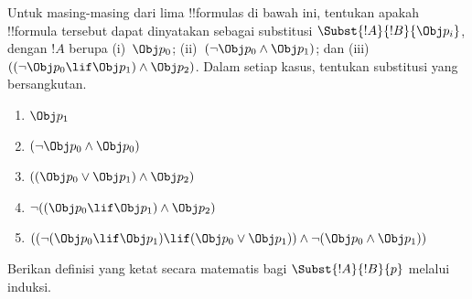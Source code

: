 \documentclass[../../../include/open-logic-section]{subfiles}
\begin{document}
\begin{prob} Untuk masing-masing dari lima !!{formula}s di bawah ini,
 tentukan apakah !!{formula} tersebut dapat dinyatakan sebagai substitusi
 \( \Subst{!A}{!B}{\Obj p_i} \), dengan \( !A \) berupa (i)~\( \Obj p_0 \);
 (ii)~\( ( \lnot \Obj p_0 \land \Obj p_1) \); dan (iii)~\( ( ( \lnot \Obj
 p_0 \lif \Obj p_1 ) \land \Obj p_2 ) \). Dalam setiap kasus, tentukan
 substitusi yang bersangkutan.
  \begin{enumerate}
    \item \( \Obj p_1 \) 
    \item \( ( \lnot \Obj p_0 \land \Obj p_0 ) \)
    \item \( ( ( \Obj p_0 \lor \Obj p_1 ) \land \Obj p_2 )  \)
    \item \( \lnot ( ( \Obj p_0 \lif \Obj p_1 ) \land \Obj p_2 ) \)
    \item \( (( \lnot ( \Obj p_0 \lif \Obj p_1 ) \lif ( \Obj p_0 \lor \Obj p_1 )) \land \lnot ( \Obj p_0 \land \Obj p_1 )) \)
  \end{enumerate}
\end{prob}

\begin{prob}
Berikan definisi yang ketat secara matematis bagi $\Subst{!A}{!B}{p}$ melalui
induksi.
\end{prob}
\end{document}
